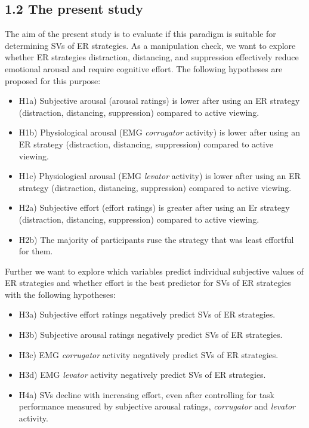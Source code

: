 \documentclass[
  english,
  man,floatsintext]{apa6}
\providecommand{\tightlist}{%
  \setlength{\itemsep}{0pt}\setlength{\parskip}{0pt}}
\begin{document}
\hypertarget{the-present-study}{%
\subsection{1.2 The present study}\label{the-present-study}}

The aim of the present study is to evaluate if this paradigm is suitable for determining SVs of ER strategies.
As a manipulation check, we want to explore whether ER strategies distraction, distancing, and suppression effectively reduce emotional arousal and require cognitive effort. The following hypotheses are proposed for this purpose:

\begin{itemize}
\tightlist
\item
  H1a) Subjective arousal (arousal ratings) is lower after using an ER strategy (distraction, distancing, suppression) compared to active viewing.
\item
  H1b) Physiological arousal (EMG \emph{corrugator} activity) is lower after using an ER strategy (distraction, distancing, suppression) compared to active viewing.
\item
  H1c) Physiological arousal (EMG \emph{levator} activity) is lower after using an ER strategy (distraction, distancing, suppression) compared to active viewing.
\item
  H2a) Subjective effort (effort ratings) is greater after using an Er strategy (distraction, distancing, suppression) compared to active viewing.
\item
  H2b) The majority of participants ruse the strategy that was least effortful for them.
\end{itemize}

Further we want to explore which variables predict individual subjective values of ER strategies and whether effort is the best predictor for SVs of ER strategies with the following hypotheses:

\begin{itemize}
\tightlist
\item
  H3a) Subjective effort ratings negatively predict SVs of ER strategies.
\item
  H3b) Subjective arousal ratings negatively predict SVs of ER strategies.
\item
  H3c) EMG \emph{corrugator} activity negatively predict SVs of ER strategies.
\item
  H3d) EMG \emph{levator} activity negatively predict SVs of ER strategies.
\item
  H4a) SVs decline with increasing effort, even after controlling for task performance measured by subjective arousal ratings, \emph{corrugator} and \emph{levator} activity.
\end{itemize}
\end{document}
